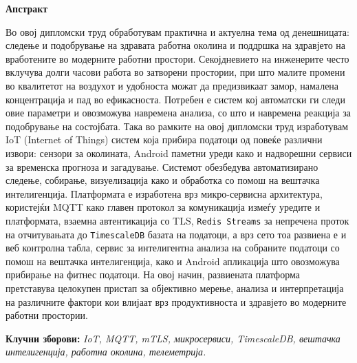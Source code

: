 \newpage
{}
\setcounter{page}{2}

{}

\begin{center}
    {\Large \textbf{Апстракт}}
\end{center}

\vspace{0.5cm}

Во овој дипломски труд обработувам практична и актуелна тема од
денешницата: следење и подобрување на здравата работна околина и
поддршка на здравјето на вработените во модерните работни простори.
Секојдневието на инженерите често вклучува долги часови работа во
затворени простории, при што малите промени во квалитетот на воздухот и
удобноста можат да предизвикаат замор, намалена концентрација и пад во
ефикасноста. Потребен е систем кој автоматски ги следи овие параметри и
овозможува навремена анализа, со што и навремена реакција за подобрување
на состојбата. Така во рамките на овој дипломски труд изработувам IoT
(Internet of Things) систем која прибира податоци од повеќе различни
извори: сензори за околината, Android паметни уреди како и надворешни
сервиси за временска прогноза и загадување. Системот обезбедува
автоматизирано следење, собирање, визуелизација како и обработка со
помош на вештачка интелигенција. Платформата е изработена врз
микро-сервисна архитектура, користејќи MQTT како главен протокол за
комуникација измеѓу уредите и платформата, взаемна автентикација со TLS,
\texttt{Redis Streams} за непречена проток на отчитувањата до \texttt{TimescaleDB} базата
на податоци, а врз сето тоа развиена е и веб контролна табла, сервис за
интелигентна анализа на собраните податоци со помош на вештачка
интелигенција, како и Android апликација што овозможува прибирање на
фитнес податоци. На овој начин, развиената платформа претставува
целокупен пристап за објективно мерење, анализа и интерпретација на
различните фактори кои влијаат врз продуктивноста и здравјето во
модерните работни простории.

\vspace{0.5cm}

\textbf{Клучни зборови:} \textit{IoT, MQTT, mTLS, микросервиси, TimescaleDB, вештачка интелигенција, работна околина, телеметрија.}

